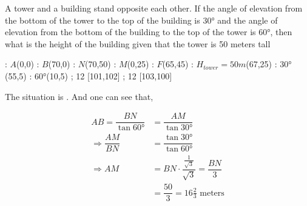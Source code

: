 
\question[2] A tower and a building stand opposite each other. If the angle of elevation
from the bottom of the tower to the top of the building is $\ang{30}$ and the angle
of elevation from the bottom of the building to the top of the tower is $\ang{60}$, then
what is the height of the building given that the tower is 50 meters tall


\ifprintanswers
  \begin{marginfigure}
      : $A$(0,0)
      : $B$(70,0)
      : $N$(70,50)
      : $M$(0,25)
      : $F$(65,45)
      : $H_{tower} = 50m$(67,25)
      : $\ang{30}$(55,5)
      : $\ang{60}$(10,5)
    \figdrawbegin{}
      \figdrawline [100,101,102,100]
      \figdrawline [101,103,100]
       ; 12 [101,102] 
       ; 12 [103,100] 
    \figdrawend
    \centerline{\box\figBoxA}
  \end{marginfigure}
\fi 

\begin{solution}[\halfpage]
	The situation is \asif. And one can see that,
	
	\begin{align}
		AB = \dfrac{BN}{\tan\ang{60}} &= \dfrac{AM}{\tan\ang{30}} \\
		\Rightarrow \dfrac{AM}{BN} &= \dfrac{\tan\ang{30}}{\tan\ang{60}} \\
		\Rightarrow AM &= BN\cdot\dfrac{\frac{1}{\sqrt{3}}}{\sqrt{3}} = \dfrac{BN}{3} \\
		               &= \dfrac{50}{3} = 16\frac{2}{3}\text{ meters}
	\end{align}
\end{solution}

